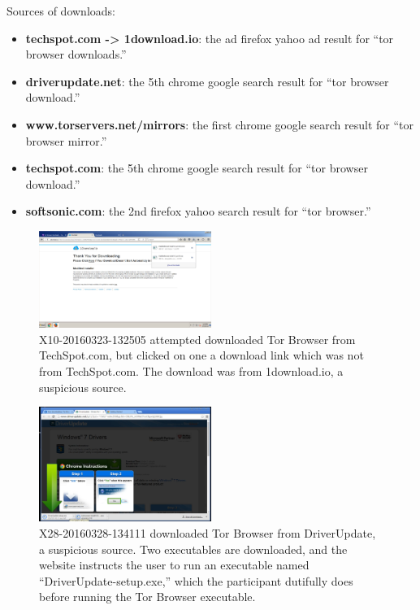 \documentclass[USenglish,oneside,twocolumn]{article}
\begin{document}
Sources of downloads: 
\begin{itemize}
\item {\bfseries techspot.com -> 1download.io}: the ad firefox yahoo ad result for ``tor browser downloads.'' 
\item {\bfseries driverupdate.net}: the 5th chrome google search result for ``tor browser download.'' 
\item {\bfseries www.torservers.net/mirrors}: the first chrome google search result for ``tor browser mirror.''
\item {\bfseries techspot.com}: the 5th chrome google search result for ``tor browser download.''
\item {\bfseries softsonic.com}: the 2nd firefox yahoo search result for ``tor browser.''
\end{itemize}

\begin{figure}[h]
\label{downloadio}
\includegraphics[width=0.5\textwidth]{../experiment/processing/bad-participants/X10-20160323-132505-1downloadio.png}
\caption{X10-20160323-132505 attempted downloaded Tor Browser from TechSpot.com, but clicked on one 
a download link which was not from TechSpot.com. The download was from 1download.io, a suspicious source.}
\end{figure} 

\begin{figure}[h]
\label{driverupdate}
\includegraphics[width=0.5\textwidth]{../experiment/processing/bad-participants/X28-20160328-134111-driverupdate.png}
\caption{X28-20160328-134111 downloaded Tor Browser from DriverUpdate, a suspicious source. Two executables
are downloaded, and the website instructs the user to run an executable named ``DriverUpdate-setup.exe,'' which the
participant dutifully does before running the Tor Browser executable.}
\end{figure} 
\end{document}
